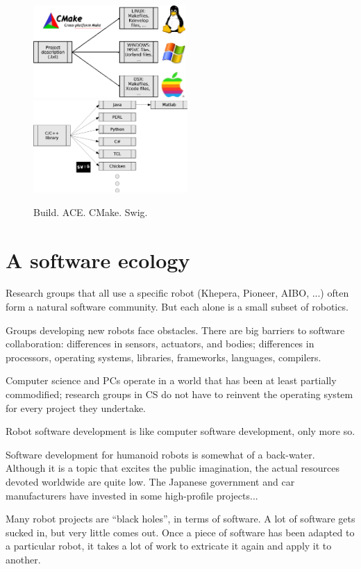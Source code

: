 

\begin{figure}[t]
\begin{center}
\includegraphics[height=3.5cm]{fig-cmake}
\ \ \ \ \ \ 
\includegraphics[height=3.5cm]{fig-swig}
\caption{
%
Build.  ACE. CMake. Swig.
%
}
\end{center}
\end{figure}


\section{A software ecology}

Research groups that all use a specific robot (Khepera, Pioneer, AIBO,
...) often form a natural software community.  But each alone is 
a small subset of robotics.

Groups developing new robots face obstacles.  There are big barriers
to software collaboration: differences in sensors, actuators, and
bodies; differences in processors, operating systems, libraries,
frameworks, languages, compilers.

Computer science and PCs operate in a world that has been at least
partially commodified; research groups in CS do not have to 
reinvent the operating system for every project they undertake.

Robot software development is like computer software development,
only more so.

Software development for humanoid robots is somewhat of a back-water.
Although it is a topic that excites the public imagination, the
actual resources devoted worldwide are quite low.  The Japanese
government and car manufacturers have invested in some high-profile
projects...


Many robot projects are ``black holes'', in terms of software.  A lot
of software gets sucked in, but very little comes out.  Once a piece
of software has been adapted to a particular robot, it takes a lot
of work to extricate it again and apply it to another.

